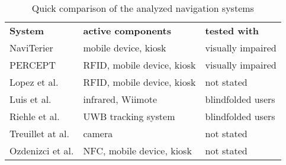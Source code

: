 \begin{table}[htbp]
  \centering
  \caption{Quick comparison of the analyzed navigation systems}
  \label{tab:navSysComp}
 \renewcommand{\arraystretch}{1.2}
    \begin{tabularx}{\textwidth}{p{2.6cm}|X|X}
    \rowcolor{mygray}
    \textbf{System} & \textbf{active components} & \textbf{tested with} \\
    NaviTerier & mobile device, kiosk & visually impaired  \\ \hline
    PERCEPT & RFID, mobile device, kiosk & visually impaired  \\ \hline
    Lopez et al. & RFID, mobile device, kiosk & not stated \\ \hline
    Luis et al. & infrared, Wiimote & blindfolded users \\ \hline
    Riehle et al. & UWB tracking system & blindfolded users \\ \hline
    Treuillet at al. & camera & not stated \\ \hline
    Ozdenizci et al. & NFC, mobile device, kiosk & not stated \\
    \end{tabularx}%
\end{table}%


